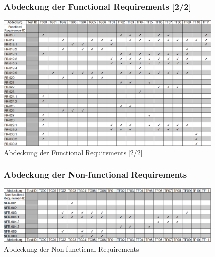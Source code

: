 \documentclass[oneside,a4paper,titlepage]{scrartcl}              %
\begin{document}
\begin{figure}[p]
  \subsubsection{Abdeckung der Functional Requirements [2/2]}
  \centering\includegraphics[angle=90,scale=0.7]{imgs/Req_Test_Abdeckung_2.png}
  \caption{Abdeckung der Functional Requirements [2/2]}
\end{figure}

\begin{figure}[p]
  \subsubsection{Abdeckung der Non-functional Requirements}
  \centering\includegraphics[angle=90,scale=0.8]{imgs/Req_Test_Abdeckung_3.png}
  \caption{Abdeckung der Non-functional Requirements}
\end{figure}

\newpage

\end{document}
